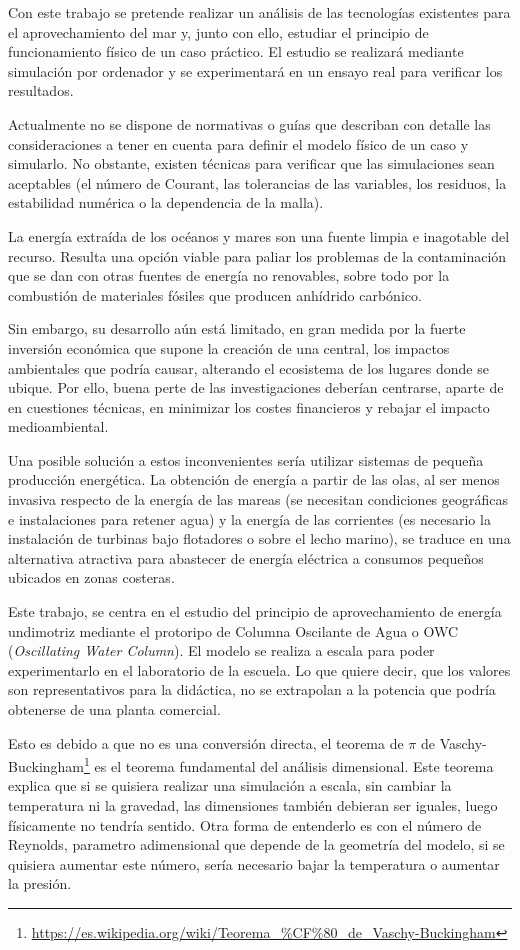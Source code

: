 Con este trabajo se pretende realizar un análisis de las tecnologías
existentes para el aprovechamiento del mar y, junto con ello, estudiar
el principio de funcionamiento físico de un caso práctico. El estudio se
realizará mediante simulación por ordenador y se experimentará en un
ensayo real para verificar los resultados.

Actualmente no se dispone de normativas o guías que describan con
detalle las consideraciones a tener en cuenta para definir el modelo
físico de un caso y simularlo. No obstante, existen técnicas para
verificar que las simulaciones sean aceptables (el número de Courant,
las tolerancias de las variables, los residuos, la estabilidad numérica
o la dependencia de la malla).

La energía extraída de los océanos y mares son una fuente limpia e
inagotable del recurso. Resulta una opción viable para paliar los
problemas de la contaminación que se dan con otras fuentes de energía no
renovables, sobre todo por la combustión de materiales fósiles que
producen anhídrido carbónico.

Sin embargo, su desarrollo aún está limitado, en gran medida por la
fuerte inversión económica que supone la creación de una central, los
impactos ambientales que podría causar, alterando el ecosistema de los
lugares donde se ubique. Por ello, buena perte de las investigaciones
deberían centrarse, aparte de en cuestiones técnicas, en minimizar los
costes financieros y rebajar el impacto medioambiental.

Una posible solución a estos inconvenientes sería utilizar sistemas de
pequeña producción energética. La obtención de energía a partir de las
olas, al ser menos invasiva respecto de la energía de las mareas (se
necesitan condiciones geográficas e instalaciones para retener agua) y
la energía de las corrientes (es necesario la instalación de turbinas
bajo flotadores o sobre el lecho marino), se traduce en una alternativa
atractiva para abastecer de energía eléctrica a consumos pequeños
ubicados en zonas costeras.

Este trabajo, se centra en el estudio del principio de aprovechamiento
de energía undimotriz mediante el protoripo de Columna Oscilante de Agua
o OWC (\emph{Oscillating Water Column}). El modelo se realiza a escala
para poder experimentarlo en el laboratorio de la escuela. Lo que quiere
decir, que los valores son representativos para la didáctica, no se
extrapolan a la potencia que podría obtenerse de una planta comercial.

Esto es debido a que no es una conversión directa, el teorema
de $\pi$ de Vaschy-Buckingham\footnote{\url{https://es.wikipedia.org/wiki/Teorema_\%CF\%80_de_Vaschy-Buckingham}}
es el teorema fundamental del análisis
dimensional. Este teorema explica que si se quisiera realizar una
simulación a escala, sin cambiar la temperatura ni la gravedad, las
dimensiones también debieran ser iguales, luego físicamente no tendría
sentido. Otra forma de entenderlo es con el número de Reynolds,
parametro adimensional que depende de la geometría del modelo, si se
quisiera aumentar este número, sería necesario bajar la temperatura o
aumentar la presión.

